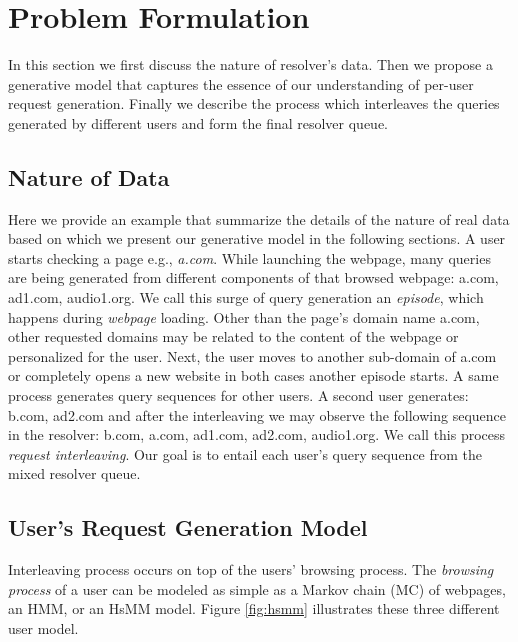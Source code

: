 	\section{Problem Formulation}
	\label{sec:gen}

	In this section we first discuss the nature of resolver's data.
	Then we propose a generative model that captures the essence of our understanding of per-user request generation.
	Finally we describe the process which interleaves the queries generated by different users and form the final resolver queue. 
	
	\subsection{Nature of Data}
	\label{subsec:nature}
	Here we provide an example that summarize the details of the nature of real data based on which we present our generative model in the following sections.	
	A user starts checking a page e.g., \emph{a.com}. While launching the webpage, many queries are being generated from different components of that browsed webpage: a.com, ad1.com, audio1.org. 
	We call this surge of query generation an \emph{episode}, which happens during \emph{webpage} loading. 
	Other than the page's domain name a.com, other requested domains may be related to the content of the webpage or personalized for the user. 
	Next, the user moves to another sub-domain of a.com or completely opens a new website in both cases another episode starts. 
	A same process generates query sequences for other users.
	A second user generates: b.com, ad2.com and after the interleaving we may observe the following sequence in the resolver: b.com, a.com, ad1.com, ad2.com, audio1.org.
	We call this process \emph{request interleaving}.
	Our goal is to entail each user's query sequence from the mixed resolver queue. 
	
	\subsection{User's Request Generation Model}
	\label{subsec:user}
	Interleaving process occurs on top of the users' browsing process. 
	The \emph{browsing process} of a user can be modeled as simple as a Markov chain (MC) of webpages, an HMM, or an HsMM model. 
	Figure \ref{fig:hsmm} illustrates these three different user model. 	
	
